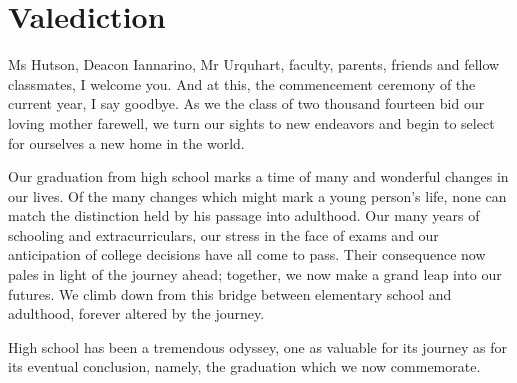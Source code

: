 \documentclass{article}
\begin{document}
\section*{Valediction}

Ms Hutson, Deacon Iannarino, Mr Urquhart, faculty, parents, friends and fellow
classmates, I welcome you. And at this, the commencement ceremony of the
current year, I say goodbye. As we the class of two thousand fourteen bid our
loving mother farewell, we turn our sights to new endeavors and begin to select
for ourselves a new home in the world.

Our graduation from high school marks a time of many and wonderful changes in
our lives. Of the many changes which might mark a young person's life, none can
match the distinction held by his passage into adulthood. Our many years of
schooling and extracurriculars, our stress in the face of exams and our
anticipation of college decisions have all come to pass.  Their consequence now
pales in light of the journey ahead; together, we now make a grand leap into
our futures. We climb down from this bridge between elementary school and
adulthood, forever altered by the journey. 

High school has been a tremendous odyssey, one as valuable for its journey as
for its eventual conclusion, namely, the graduation which we now commemorate.
\end{document}
